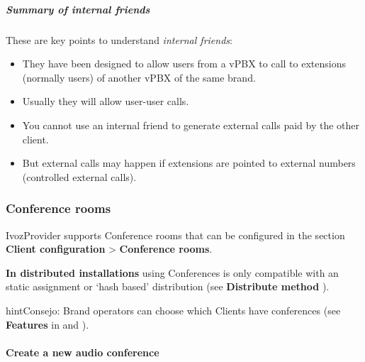 \documentclass[letterpaper,10pt,spanish]{sphinxmanual}
\begin{document}
\subparagraph{Summary of internal friends}
\label{administration_portal/client/vpbx/routing_endpoints/friends/internal_friends:summary-of-internal-friends}
These are key points to understand \emph{internal friends}:
\begin{itemize}
\item {} 
They have been designed to allow users from a vPBX to call to extensions (normally users)
of another vPBX of the same brand.

\item {} 
Usually they will allow user-user calls.

\item {} 
You cannot use an internal friend to generate external calls paid by the other client.

\item {} 
But external calls may happen if extensions are pointed to external numbers (controlled external calls).

\end{itemize}


\subsubsection{Conference rooms}
\label{administration_portal/client/vpbx/routing_endpoints/conference_rooms::doc}\label{administration_portal/client/vpbx/routing_endpoints/conference_rooms:conference-rooms}\label{administration_portal/client/vpbx/routing_endpoints/conference_rooms:id1}
IvozProvider supports Conference rooms that can be configured in the section
\textbf{Client configuration} \textgreater{} \textbf{Conference rooms}.

\textbf{In distributed installations} using Conferences is only compatible with an static
assignment or `hash based' distribution (see \textbf{Distribute method} {\hyperref[administration_portal/brand/clients/virtual_pbx:virtual\string-pbx]{}}).

\begin{notice}{hint}{Consejo:}
Brand operators can choose which Clients have conferences (see \textbf{Features}
in {\hyperref[getting_started/internal_calls/brand_portal:brand\string-configuration]{}} and {\hyperref[getting_started/internal_calls/client_portal:client\string-configuration]{}}).
\end{notice}
\paragraph{Create a new audio conference}
\end{document}
